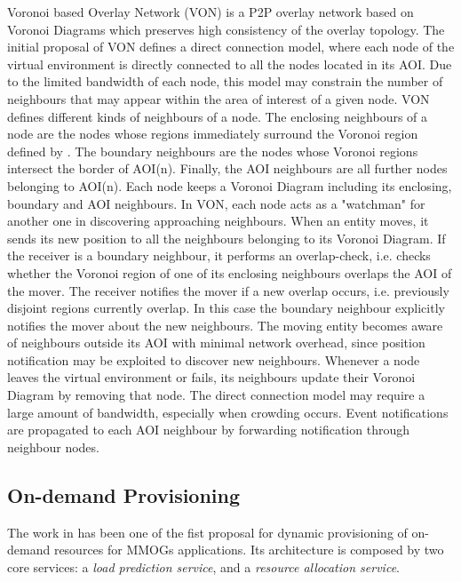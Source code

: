 \documentclass[final,10pt,a5paper]{phdimt}
\theoremstyle{definition}
\begin{document}
Voronoi based Overlay Network (VON) \cite{Hu2006} is a P2P overlay network based on Voronoi Diagrams which preserves high consistency of the overlay topology. 
The initial proposal of VON defines a direct connection model, where each node of the  virtual environment is directly connected to all the nodes located in its AOI. Due to the limited bandwidth of each node, this model may constrain the number of neighbours that may appear within the area of interest of a given node. VON defines different kinds of neighbours of a node. The enclosing neighbours of a node  are the nodes whose regions immediately surround the Voronoi region defined by .
The boundary neighbours are the nodes whose Voronoi regions intersect the border of AOI(n).
Finally, the AOI neighbours are all further nodes belonging to AOI(n).  Each node keeps a Voronoi Diagram including its enclosing, boundary and AOI neighbours. In VON, each node acts as a "watchman" for another one in discovering approaching neighbours. When an entity moves, it sends its new position to all the neighbours belonging to its Voronoi Diagram. If the receiver is a boundary neighbour, it performs an overlap-check, i.e. checks whether the Voronoi region of one of its enclosing neighbours overlaps the AOI of the mover. The receiver notifies the mover if a new overlap occurs, i.e. previously disjoint regions currently overlap. In this case the boundary neighbour explicitly notifies the mover about the new neighbours.
The moving entity becomes aware of neighbours outside its AOI with minimal network overhead, since position notification may be exploited to discover new neighbours.
Whenever a node leaves the virtual environment or fails, its neighbours update their Voronoi Diagram by removing that node.
The direct connection model may require a large amount of bandwidth, especially when crowding occurs. 
Event notifications are propagated to each AOI neighbour by forwarding notification through neighbour nodes.



\subsection{On-demand Provisioning}

The work in \cite{prodan2009prediction} has been one of the fist proposal for dynamic provisioning of on-demand resources for MMOGs applications.
Its architecture is composed by two core services: a \textit{load prediction service}, and a \textit{resource allocation service}.
\end{document}
